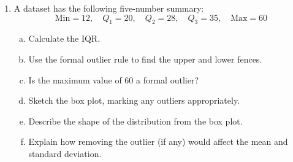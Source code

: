 \documentclass{article}
\begin{document}
\begin{enumerate}
  \item A dataset has the following five-number summary:
  \[
    \text{Min} = 12,\quad Q_1 = 20,\quad Q_2 = 28,\quad Q_3 = 35,\quad \text{Max} = 60
  \]
  \begin{enumerate}[(a)]
    \item Calculate the IQR.
    \item Use the formal outlier rule to find the upper and lower fences.
    \item Is the maximum value of 60 a formal outlier?
    \item Sketch the box plot, marking any outliers appropriately.
    \item Describe the shape of the distribution from the box plot.
    \item Explain how removing the outlier (if any) would affect the mean and standard deviation.
  \end{enumerate}

\end{enumerate}
\end{document}
